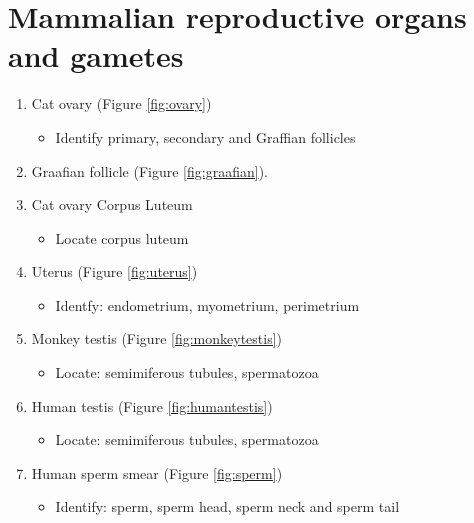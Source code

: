 \section{Mammalian reproductive organs and
gametes}\label{mammalian-reproductive-organs-and-gametes}

\begin{enumerate}
\def\labelenumi{\arabic{enumi}.}
\tightlist
\item
  Cat ovary (Figure \ref{fig:ovary})
\begin{itemize}
  \item
  Identify primary, secondary and
  Graffian follicles
\end{itemize}
\item
  Graafian follicle (Figure \ref{fig:graafian}).
\item
  Cat ovary Corpus Luteum
  \begin{itemize}
    \item
  Locate corpus luteum
\end{itemize}
\item
  Uterus (Figure \ref{fig:uterus})

\begin{itemize}
  \item
  Identfy: endometrium, myometrium,
  perimetrium
\end{itemize}

\item
  Monkey testis (Figure \ref{fig:monkeytestis})

\begin{itemize}
  \item
  Locate: semimiferous
  tubules, spermatozoa
\end{itemize}

\item
  Human testis (Figure \ref{fig:humantestis})
  \begin{itemize}
    \item
    Locate: semimiferous
    tubules, spermatozoa
  \end{itemize}
\item
  Human sperm smear (Figure \ref{fig:sperm})

\begin{itemize}
  \item
  Identify: sperm, sperm
  head, sperm neck and sperm tail
\end{itemize}


\end{enumerate}

